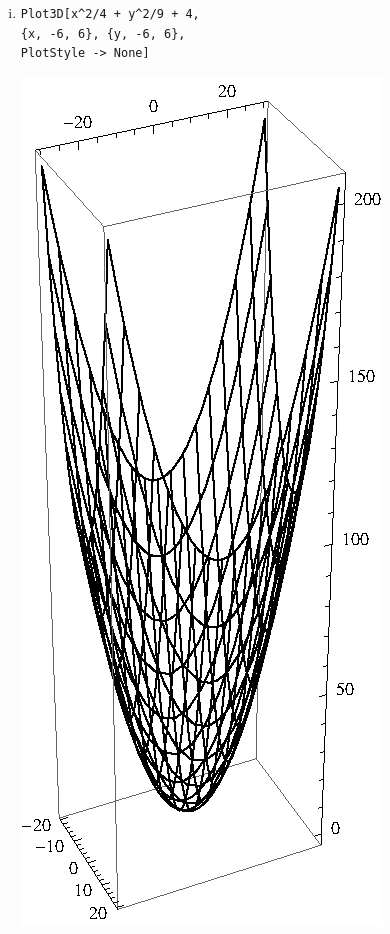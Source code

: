 \documentclass[10pt,a4paper]{scrartcl}
\begin{document}
\begin{enumerate}[(i)]
\begin{minipage}{0.49\columnwidth}
\begin{center}
\end{center}
\end{minipage}
\item 
\begin{minipage}{0.50\columnwidth}
\begin{lstlisting}[caption= Mathematica Code für den Graph von h]
Plot3D[x^2/4 + y^2/9 + 4, 
{x, -6, 6}, {y, -6, 6},
PlotStyle -> None]
\end{lstlisting}
\end{minipage}
\begin{minipage}{0.50\columnwidth}
\begin{center}
\includegraphics[scale=0.7]{1ii.eps} 

\end{center}
\end{minipage}
\end{enumerate}
\end{document}
